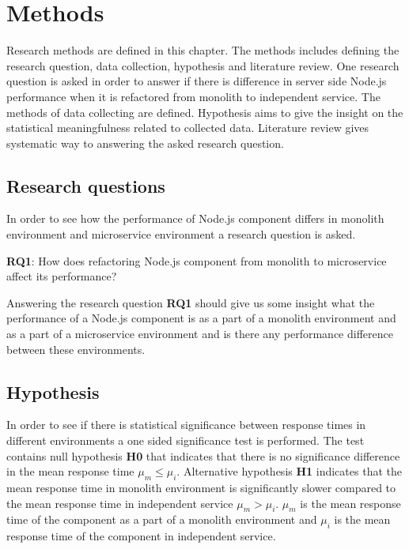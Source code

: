\chapter{Methods\label{methods}}
Research methods are defined in this chapter.
The methods includes defining the research question, data collection, hypothesis and literature review.
One research question is asked in order to answer if there is difference in server side Node.js performance when it is refactored from monolith to independent service.
The methods of data collecting are defined.
Hypothesis aims to give the insight on the statistical meaningfulness related to collected data.
Literature review gives systematic way to answering the asked research question.


\section{Research questions}
In order to see how the performance of Node.js component differs in monolith environment and microservice environment a research question is asked.

\textbf{RQ1}: How does refactoring Node.js component from monolith to microservice affect its performance?

Answering the research question \textbf{RQ1} should give us some insight what the performance of a Node.js component is as a part of a monolith environment and as a part of a microservice environment and is there any performance difference between these environments.

\section{Hypothesis}
In order to see if there is statistical significance between response times in different environments a one sided significance test is performed.
The test contains null hypothesis \textbf{H0} that indicates that there is no significance difference in the mean response time $\mu_m\le\mu_i$.
Alternative hypothesis \textbf{H1} indicates that the mean response time in monolith environment is significantly slower compared to the mean response time in independent service $\mu_m>\mu_i$.
$\mu_m$ is the mean response time of the component as a part of a monolith environment and $\mu_i$ is the mean response time of the component in independent service.

